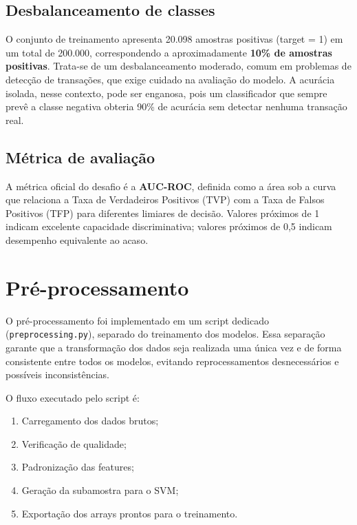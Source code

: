 \documentclass[a4paper,12pt]{article}
\begin{document}
\subsection{Desbalanceamento de classes}

O conjunto de treinamento apresenta 20.098 amostras positivas (target = 1) em um total de 200.000, correspondendo a aproximadamente \textbf{10\% de amostras positivas}. Trata-se de um desbalanceamento moderado, comum em problemas de detecção de transações, que exige cuidado na avaliação do modelo. A acurácia isolada, nesse contexto, pode ser enganosa, pois um classificador que sempre prevê a classe negativa obteria 90\% de acurácia sem detectar nenhuma transação real.

\subsection{Métrica de avaliação}

A métrica oficial do desafio é a \textbf{AUC-ROC}, definida como a área sob a curva que relaciona a Taxa de Verdadeiros Positivos (TVP) com a Taxa de Falsos Positivos (TFP) para diferentes limiares de decisão. Valores próximos de 1 indicam excelente capacidade discriminativa; valores próximos de 0,5 indicam desempenho equivalente ao acaso.

\newpage

\section{Pré-processamento}

O pré-processamento foi implementado em um script dedicado (\texttt{preprocessing.py}), separado do treinamento dos modelos. Essa separação garante que a transformação dos dados seja realizada uma única vez e de forma consistente entre todos os modelos, evitando reprocessamentos desnecessários e possíveis inconsistências.

O fluxo executado pelo script é:

\begin{enumerate}
    \item Carregamento dos dados brutos;
    \item Verificação de qualidade;
    \item Padronização das features;
    \item Geração da subamostra para o SVM;
    \item Exportação dos arrays prontos para o treinamento.
\end{enumerate}
\end{document}
